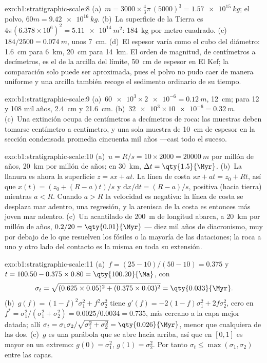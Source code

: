 \begin{solution}{exo:b1:stratigraphic-scale:8}
(a)~$m = 3000 \times \frac43\pi\,(5000)^3 = \qty{1.57e15}{kg}$; el polvo, $60m = \qty{9.42e16}{kg}$. (b)~La superficie de la Tierra es $4\pi(6.378\times10^6)^2
= \qty{5.11e14}{m^2}$: \qty{184}{kg} por metro cuadrado. (c)~$184/2500 =
\qty{0.074}{m}$, unos \qty{7}{cm}. (d)~El espesor varía como el cubo del diámetro: \qty{1.6}{cm} para \qty{6}{km}, \qty{20}{cm} para \qty{14}{km}. El orden de magnitud, de centímetros a decímetros, es el de la arcilla del límite,
\qty{50}{cm} de espesor en El Kef; la comparación solo puede ser aproximada, pues el polvo no pudo caer de manera uniforme y una arcilla también recoge el sedimento ordinario de su tiempo.
\end{solution}

\begin{solution}{exo:b1:stratigraphic-scale:9}
(a)~$\num{60e3} \times \num{2e-6} = \qty{0.12}{m}$, \qty{12}{cm}; para 12 y 108 mil años, \qty{2.4}{cm} y \qty{21.6}{cm}. (b)~$\num{32e3} \times
\num{10e-6} = \qty{0.32}{m}$. (c)~Una extinción ocupa de centímetros a decímetros de roca: las muestras deben tomarse centímetro a centímetro, y una sola muestra de \qty{10}{cm} de espesor en la sección condensada promedia cincuenta mil años ---casi todo el suceso.
\end{solution}

\begin{solution}{exo:b1:stratigraphic-scale:10}
(a)~$u = R/s = 10 \times 2000 = \qty{20000}{m}$ por millón de años,
\qty{20}{km} por millón de años; en \qty{30}{km}, $\Delta t = \qty{1.5}{\Myr}$.
(b)~La llanura es ahora la superficie $z = s x + a t$. La línea de costa
$s x + a t = z_0 + R t$, así que $x(t) = (z_0 + (R - a)t)/s$ y
$\mathrm dx/\mathrm dt = (R - a)/s$, positiva (hacia tierra) mientras $a < R$. Cuando
$a > R$ la velocidad es negativa: la línea de costa se desplaza mar adentro, una regresión, y la arenisca de la costa es entonces más joven mar adentro. (c)~Un acantilado de \qty{200}{m} de longitud abarca, a \qty{20}{km} por millón de años, $0.2/20 = \qty{0.01}{\Myr}$ --- diez mil años de diacronismo, muy por debajo de lo que resuelven los fósiles o la mayoría de las dataciones; la roca a uno y otro lado del contacto es la misma en toda su extensión.
\end{solution}

\begin{solution}{exo:b1:stratigraphic-scale:11}
(a)~$f = (25 - 10)/(50 - 10) = 0.375$ y $t = 100.50 - 0.375 \times 0.80 =
\qty{100.20}{\Ma}$, con
\[
  \sigma_t = \sqrt{(0.625 \times 0.05)^2 + (0.375 \times 0.03)^2} = \qty{0.033}{\Myr}.
\] (b)~$g(f) = (1 - f)^2\sigma_1^2 + f^2\sigma_2^2$
tiene $g'(f) = -2(1 - f)\sigma_1^2 + 2f\sigma_2^2$, cero en $f^* =
\sigma_1^2/(\sigma_1^2 + \sigma_2^2) = 0.0025/0.0034 = 0.735$, más cercano a la capa mejor
datada; allí $\sigma_t = \sigma_1\sigma_2/\sqrt{\sigma_1^2 + \sigma_2^2} =
\qty{0.026}{\Myr}$, menor que cualquiera de las dos. (c)~$g$ es una parábola que se abre hacia arriba, así que en $[0, 1]$ es mayor en un extremo: $g(0) = \sigma_1^2$, $g(1) = \sigma_2^2$.
Por tanto $\sigma_t \le \max(\sigma_1, \sigma_2)$ entre las capas.
\end{solution}

